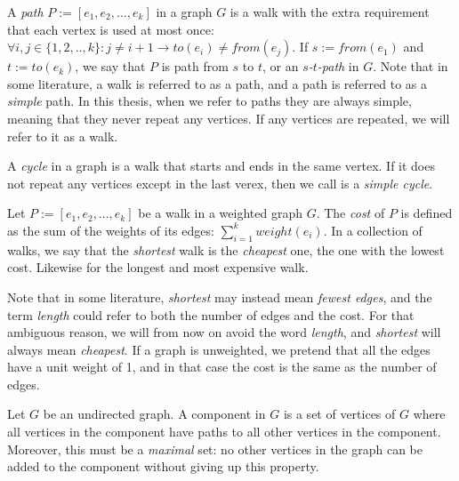 \begin{definition}[Path]
    A \emph{path} $P := [e_1, e_2, ..., e_k]$ in a graph $G$ is a walk with the extra requirement that each vertex is used at most once: $\forall i, j \in \{1,2,..,k\} : j \neq {i+1} \rightarrow to(e_i) \neq from(e_j)$.
    If $s := from(e_1)$ and $t := to(e_k)$, we say that $P$ is path from $s$ to $t$, or an \emph{$s$-$t$-path} in $G$.
    Note that in some literature, a walk is referred to as a path, and a path is referred to as a \emph{simple} path. In this thesis, when we refer to paths they are always simple, meaning that they never repeat any vertices. If any vertices are repeated, we will refer to it as a walk.    
\end{definition}

\begin{definition}[Cycle]
    A \emph{cycle} in a graph is a walk that starts and ends in the same vertex. If it does not repeat any vertices except in the last verex, then we call is a \emph{simple cycle}.
\end{definition}

\begin{definition}
    Let $P := [e_1, e_2, ..., e_k]$ be a walk in a weighted graph $G$. The \emph{cost} of $P$ is defined as the sum of the weights of its edges: $\sum_{i=1}^k weight(e_i)$. In a collection of walks, we say that the \emph{shortest} walk is the \emph{cheapest} one, the one with the lowest cost. Likewise for the longest and most expensive walk. 

    Note that in some literature, \emph{shortest} may instead mean \emph{fewest edges}, and the term \emph{length} could refer to both the number of edges and the cost. For that ambiguous reason, we will from now on avoid the word \emph{length}, and \emph{shortest} will always mean \emph{cheapest}. If a graph is unweighted, we pretend that all the edges have a unit weight of 1, and in that case the cost is the same as the number of edges.
\end{definition}

\begin{definition}
    Let $G$ be an undirected graph. A component in $G$ is a set of vertices of $G$ where all vertices in the component have paths to all other vertices in the component. Moreover, this must be a \emph{maximal} set: no other vertices in the graph can be added to the component without giving up this property.
\end{definition}

